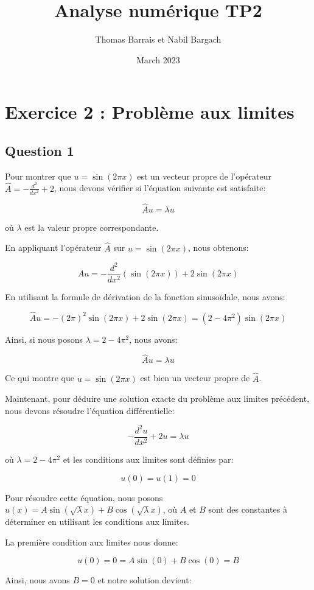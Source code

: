 \documentclass{article}
\title{Analyse numérique TP2}
\author{Thomas Barrais et Nabil Bargach}
\date{March 2023}
\begin{document}
\maketitle

\section{Exercice 2 : Problème aux limites} 

\subsection{Question 1}
Pour montrer que $u = \sin(2\pi x)$ est un vecteur propre de l'opérateur $\hat{A} = -\frac{d^2}{dx^2} + 2$, nous devons vérifier si l'équation suivante est satisfaite:

$$\hat{A}u = \lambda u$$

où $\lambda$ est la valeur propre correspondante.

En appliquant l'opérateur $\hat{A}$ sur $u = \sin(2\pi x)$, nous obtenons:

$$\hat{A}u = -\frac{d^2}{dx^2}(\sin(2\pi x)) + 2\sin(2\pi x)$$

En utilisant la formule de dérivation de la fonction sinusoïdale, nous avons:

$$\hat{A}u = -(2\pi)^2\sin(2\pi x) + 2\sin(2\pi x) = (2-4\pi^2)\sin(2\pi x)$$

Ainsi, si nous posons $\lambda = 2 - 4\pi^2$, nous avons:

$$\hat{A}u = \lambda u$$

Ce qui montre que $u = \sin(2\pi x)$ est bien un vecteur propre de $\hat{A}$.

Maintenant, pour déduire une solution exacte du problème aux limites précédent, nous devons résoudre l'équation différentielle:

$$-\frac{d^2u}{dx^2} + 2u = \lambda u$$

où $\lambda = 2 - 4\pi^2$ et les conditions aux limites sont définies par:

$$u(0) = u(1) = 0$$

Pour résoudre cette équation, nous posons $u(x) = A\sin(\sqrt{\lambda} x) + B\cos(\sqrt{\lambda} x)$, où $A$ et $B$ sont des constantes à déterminer en utilisant les conditions aux limites.

La première condition aux limites nous donne:

$$u(0) = 0 = A\sin(0) + B\cos(0) = B$$

Ainsi, nous avons $B = 0$ et notre solution devient:
\end{document}
